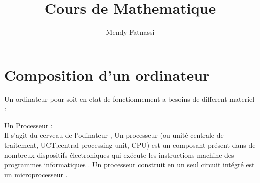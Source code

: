 \documentclass[a4paper,12pt,openany]{book}
\author{Mendy Fatnassi}
\title{Cours de Mathematique}
\begin{document}
\maketitle
\tableofcontents

\chapter{Composition d'un ordinateur}
Un ordinateur pour soit en etat de fonctionnement a besoins de different materiel :

\underline{Un Processeur} :\\
Il s'agit du cerveau de l'odinateur , Un processeur (ou unité centrale de traitement, UCT,central processing unit, CPU) est un composant présent dans de nombreux dispositifs électroniques qui exécute les instructions machine des programmes informatiques . Un processeur construit en un seul circuit intégré est un microprocesseur .
\end{document}
